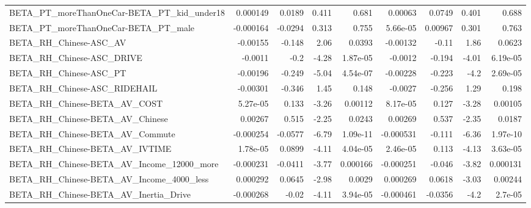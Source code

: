 \begin{tabular}{lrrrrrrrr}
BETA\_PT\_moreThanOneCar-BETA\_PT\_kid\_under18         &    0.000149 &       0.0189 &    0.411 &    0.681 &    0.00063 &      0.0749 &        0.401 &         0.688 \\
BETA\_PT\_moreThanOneCar-BETA\_PT\_male                &   -0.000164 &      -0.0294 &    0.313 &    0.755 &   5.66e-05 &     0.00967 &        0.301 &         0.763 \\
BETA\_RH\_Chinese-ASC\_AV                             &    -0.00155 &       -0.148 &     2.06 &   0.0393 &   -0.00132 &       -0.11 &         1.86 &        0.0623 \\
BETA\_RH\_Chinese-ASC\_DRIVE                          &     -0.0011 &         -0.2 &    -4.28 & 1.87e-05 &    -0.0012 &      -0.194 &        -4.01 &      6.19e-05 \\
BETA\_RH\_Chinese-ASC\_PT                             &    -0.00196 &       -0.249 &    -5.04 & 4.54e-07 &   -0.00228 &      -0.223 &         -4.2 &      2.69e-05 \\
BETA\_RH\_Chinese-ASC\_RIDEHAIL                       &    -0.00301 &       -0.346 &     1.45 &    0.148 &    -0.0027 &      -0.256 &         1.29 &         0.198 \\
BETA\_RH\_Chinese-BETA\_AV\_COST                       &    5.27e-05 &        0.133 &    -3.26 &  0.00112 &   8.17e-05 &       0.127 &        -3.28 &       0.00105 \\
BETA\_RH\_Chinese-BETA\_AV\_Chinese                    &     0.00267 &        0.515 &    -2.25 &   0.0243 &    0.00269 &       0.537 &        -2.35 &        0.0187 \\
BETA\_RH\_Chinese-BETA\_AV\_Commute                    &   -0.000254 &      -0.0577 &    -6.79 & 1.09e-11 &  -0.000531 &      -0.111 &        -6.36 &      1.97e-10 \\
BETA\_RH\_Chinese-BETA\_AV\_IVTIME                     &    1.78e-05 &       0.0899 &    -4.11 & 4.04e-05 &   2.46e-05 &       0.113 &        -4.13 &      3.63e-05 \\
BETA\_RH\_Chinese-BETA\_AV\_Income\_12000\_more          &   -0.000231 &      -0.0411 &    -3.77 & 0.000166 &  -0.000251 &      -0.046 &        -3.82 &      0.000131 \\
BETA\_RH\_Chinese-BETA\_AV\_Income\_4000\_less           &    0.000292 &       0.0645 &    -2.98 &   0.0029 &   0.000269 &      0.0618 &        -3.03 &       0.00244 \\
BETA\_RH\_Chinese-BETA\_AV\_Inertia\_Drive              &   -0.000268 &        -0.02 &    -4.11 & 3.94e-05 &  -0.000461 &     -0.0356 &         -4.2 &       2.7e-05 \\

\end{tabular}
